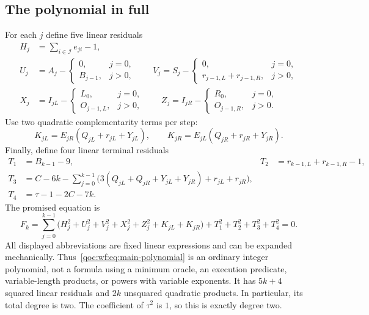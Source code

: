 \documentclass[11pt,letterpaper]{article}
\theoremstyle{definition}
\theoremstyle{remark}
\newcommand{\rulei}{\mathcal I}
\begin{document}
\subsection{The polynomial in full}
For each $j$ define five linear residuals
\begin{align}
 H_j&=\sum_{i\in\rulei} e_{ji}-1,\label{qoc:wf:eq:residual-h}\\
 U_j&=A_j-\begin{cases}0,&j=0,\\B_{j-1},&j>0,\end{cases}\qquad
 V_j=S_j-\begin{cases}0,&j=0,\\r_{j-1,L}+r_{j-1,R},&j>0,\end{cases}\label{qoc:wf:eq:residual-control}\\
 X_j&=I_{jL}-\begin{cases}L_0,&j=0,\\O_{j-1,L},&j>0,\end{cases}\qquad
 Z_j=I_{jR}-\begin{cases}R_0,&j=0,\\O_{j-1,R},&j>0.\end{cases}\label{qoc:wf:eq:residual-tape}
\end{align}
Use two quadratic complementarity terms per step:
\begin{equation}\label{qoc:wf:eq:complementarity}
 K_{jL}=E_{jR}(Q_{jL}+r_{jL}+Y_{jL}),\qquad
 K_{jR}=E_{jL}(Q_{jR}+r_{jR}+Y_{jR}).
\end{equation}
Finally, define four linear terminal residuals
\begin{align}
 T_1&=B_{k-1}-9,& T_2&=r_{k-1,L}+r_{k-1,R}-1,\label{qoc:wf:eq:terminal-halt}\\
 T_3&=C-6k-\sum_{j=0}^{k-1}
 \bigl(3(Q_{jL}+Q_{jR}+Y_{jL}+Y_{jR})+r_{jL}+r_{jR}\bigr),\label{qoc:wf:eq:terminal-count}\\
 T_4&=\tau-1-2C-7k.\label{qoc:wf:eq:terminal-time}
\end{align}
The promised equation is
\begin{equation}\label{qoc:wf:eq:main-polynomial}
 \boxed{\displaystyle
 F_k=\sum_{j=0}^{k-1}
 \bigl(H_j^2+U_j^2+V_j^2+X_j^2+Z_j^2+K_{jL}+K_{jR}\bigr)
       +T_1^2+T_2^2+T_3^2+T_4^2=0.}
\end{equation}
All displayed abbreviations are fixed linear expressions and can be expanded mechanically. Thus~\eqref{qoc:wf:eq:main-polynomial} is an ordinary integer polynomial, not a formula using a minimum oracle, an execution predicate, variable-length products, or powers with variable exponents. It has $5k+4$ squared linear residuals and $2k$ unsquared quadratic products. In particular, its total degree is two. The coefficient of $\tau^2$ is $1$, so this is exactly degree two.
\end{document}
